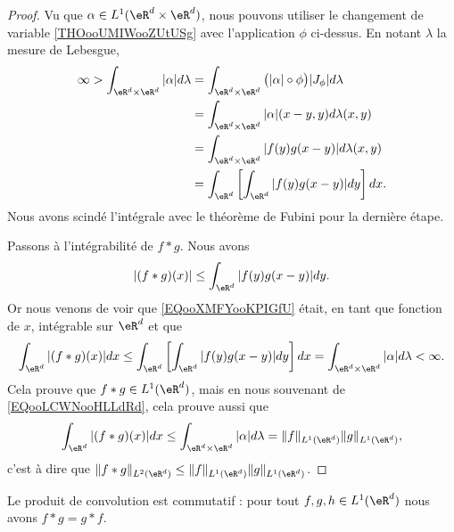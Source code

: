 \begin{proof}
    Vu que \( \alpha\in L^1(\eR^d\times \eR^d)\), nous pouvons utiliser le changement de variable \ref{THOooUMIWooZUtUSg} avec l'application \( \phi\) ci-dessus. En notant \( \lambda\) la mesure de Lebesgue,
    \begin{subequations}
        \begin{align}
            \infty>\int_{\eR^d\times \eR^d}| \alpha |d\lambda&=\int_{\eR^d\times \eR^d}\big( | \alpha |\circ\phi \big)| J_{\phi} |d\lambda\\
            &=\int_{\eR^d\times \eR^d}| \alpha |(x-y,y)d\lambda(x,y)\\
            &=\int_{\eR^d\times \eR^d}| f(y)g(x-y) |d\lambda(x,y)\\
            &=\int_{\eR^d}\left[ \int_{\eR^d}| f(y)g(x-y) |dy \right]dx.
        \end{align}
    \end{subequations}
    Nous avons scindé l'intégrale avec le théorème de Fubini pour la dernière étape.

    Passons à l'intégrabilité de \( f*g\). Nous avons
    \begin{equation}        \label{EQooXMFYooKPIGfU}
        | (f*g)(x) |\leq \int_{\eR^d}| f(y)g(x-y) |dy.
    \end{equation}
    Or nous venons de voir que \eqref{EQooXMFYooKPIGfU} était, en tant que fonction de \( x\), intégrable sur \( \eR^d\) et que
    \begin{equation}
        \int_{\eR^d}| (f*g)(x) |dx\leq\int_{\eR^d}\left[ \int_{\eR^d}| f(y)g(x-y) |dy \right]dx=\int_{\eR^d\times \eR^d}| \alpha |d\lambda<\infty.
    \end{equation}
    Cela prouve que \( f*g\in L^1(\eR^d)\), mais en nous souvenant de \eqref{EQooLCWNooHLLdRd}, cela prouve aussi que
    \begin{equation}
        \int_{\eR^d}| (f*g)(x) |dx\leq\int_{\eR^d\times \eR^d}| \alpha |d\lambda=\| f \|_{L^1(\eR^d)}\| g \|_{L^1(\eR^d)},
    \end{equation}
    c'est à dire que \( \| f*g \|_{L^2(\eR^d)}\leq \| f \|_{L^1(\eR^d)}\| g \|_{L^1(\eR^d)}\).
\end{proof}

\begin{lemma}       \label{LEMooMRWZooHjrnHD}
    Le produit de convolution est commutatif : pour tout \( f,g,h\in L^1(\eR^d)\) nous avons \( f*g=g*f\).
\end{lemma}

